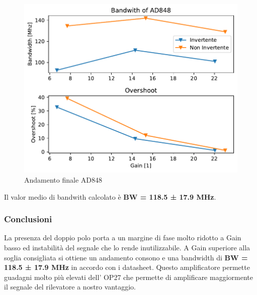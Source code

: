 \begin{figure}[!h]
    \centering
    \includegraphics[width=0.5\linewidth]{analog/assets/AD848/AD848_dati_tot.pdf}
    \caption{Andamento finale AD848 }
\end{figure}

Il valor medio di bandwith calcolato è \textbf{BW = 118.5 ± 17.9 MHz}.

\subsubsection{Conclusioni}
La presenza del doppio polo porta a un margine di fase molto ridotto a Gain basso ed instabilità del segnale che lo rende inutilizzabile. A Gain superiore alla soglia consigliata si ottiene un andamento consono e una bandwidth di \textbf{BW = 118.5 ± 17.9 MHz} in accordo con i datasheet.
Questo amplificatore permette guadagni molto più elevati dell' OP27 che permette di amplificare maggiormente il segnale del rilevatore a nostro vantaggio.